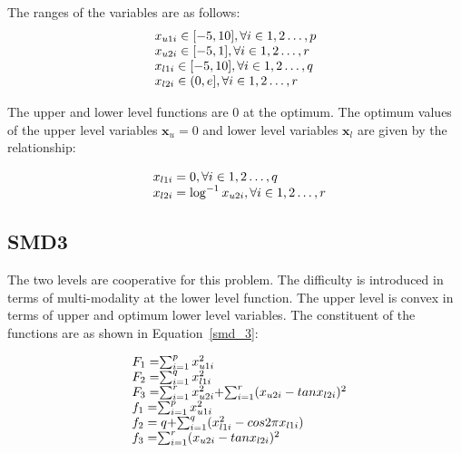 The ranges of the variables are as follows:
\begin{equation}
\begin{array}{lr}

$$x_{u1i} \in  [-5,10],          \forall i \in {1,2\ldots,p}$$\\
$$x_{u2i} \in  [-5,1],          \forall i \in {1,2\ldots,r}$$\\
$$x_{l1i} \in  [-5,10],          \forall i \in {1,2\ldots,q}$$\\
$$x_{l2i} \in  (0,e],          \forall i \in {1,2\ldots,r}$$
\end{array}
\label{smd_equ2}
\end{equation}


The upper and lower level functions are 0 at the optimum. The optimum values of the upper level variables $\mathbf{x}_u=0$ and lower level variables $\mathbf{x}_l$ are given by the relationship: 

\begin{equation}
\begin{array}{lr}
\text{}\hspace{2mm} x_{l1i}=0,  \forall i \in {1,2\ldots,q} \\
\text{}\hspace{2mm} x_{l2i}=\log^{-1} x_{u2i},  \forall i \in {1,2\ldots,r} \\
\end{array}
\label{basic_2}
\end{equation}

\subsection{SMD3}

The two levels are cooperative for this problem. The difficulty is introduced in terms of multi-modality at the lower level function. The upper level is convex in terms of upper and optimum lower level variables. The constituent of the functions are as shown in Equation~\ref{smd_3}:


\begin{equation}
\begin{array}{lr}
\text{}\hspace{2mm} F_1=$$\sum_{	i=1}^{p} x_{u1i}^{2} $$\\
\text{}\hspace{2mm} F_2=$$\sum_{	i=1}^{q} x_{l1i}^{2} $$\\
\text{}\hspace{2mm} F_3=$$\sum_{	i=1}^{r} x_{u2i}^{2} $$+$$\sum_{	i=1}^{r} (x_{u2i}-tan x_{l2i})^{2} $$\\
\text{}\hspace{2mm} f_1=$$\sum_{	i=1}^{p} x_{u1i}^{2} $$\\
\text{}\hspace{2mm} f_2=q+$$\sum_{	i=1}^{q} (x_{l1i}^{2}-cos2 \pi x_{l1i} )$$\\
\text{}\hspace{2mm} f_3=$$\sum_{	i=1}^{r} (x_{u2i}-tan x_{l2i})^{2} $$\\

\end{array}
\label{smd_3}
\end{equation}



